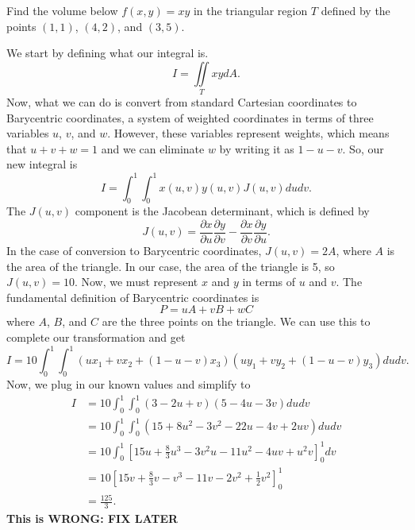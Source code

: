\begin{example}
    Find the volume below $f(x, y) = xy$ in the triangular region $T$ defined by the points $(1, 1)$, $(4, 2)$, and $(3, 5)$.
    
    \begin{soln}
        We start by defining what our integral is.
        \[I = \iint\limits_{T}xydA.\]
        Now, what we can do is convert from standard Cartesian coordinates to Barycentric coordinates, a system of weighted coordinates in terms of three variables $u$, $v$, and $w$. However, these variables represent weights, which means that $u + v + w = 1$ and we can eliminate $w$ by writing it as $1 - u - v$. So, our new integral is
        \[I = \int_{0}^{1}\int_{0}^{1}x(u, v)y(u, v)J(u, v)dudv.\]
        The $J(u, v)$ component is the Jacobean determinant, which is defined by
        \[J(u, v) = \frac{\partial x}{\partial u}\frac{\partial y}{\partial v} - \frac{\partial x}{\partial v}\frac{\partial y}{\partial u}.\]
        In the case of conversion to Barycentric coordinates, $J(u, v) = 2A$, where $A$ is the area of the triangle. In our case, the area of the triangle is 5, so $J(u, v) = 10$. Now, we must represent $x$ and $y$ in terms of $u$ and $v$. The fundamental definition of Barycentric coordinates is
        \[P = uA + vB + wC\]
        where $A$, $B$, and $C$ are the three points on the triangle. We can use this to complete our transformation and get
        \[I = 10\int_{0}^{1}\int_{0}^{1}(ux_{1} + vx_{2} + (1 - u - v)x_{3})(uy_{1} + vy_{2} + (1 - u - v)y_{3})dudv.\]
        Now, we plug in our known values and simplify to
        \begin{align*}
            I &= 10\int_{0}^{1}\int_{0}^{1}(3 - 2u + v)(5 - 4u - 3v)dudv \\
            &= 10\int_{0}^{1}\int_{0}^{1}(15 + 8u^{2} - 3v^{2} - 22u - 4v + 2uv)dudv \\
            &= 10\int_{0}^{1}\left[15u + \frac{8}{3}u^{3} - 3v^{2}u - 11u^{2} - 4uv + u^{2}v\right]_{0}^{1}dv \\
            &= 10\left[15v + \frac{8}{3}v - v^{3} - 11v - 2v^{2} + \frac{1}{2}v^{2}\right]_{0}^{1} \\
            &= \frac{125}{3}.
        \end{align*}
        \textbf{This is WRONG: FIX LATER}
    \end{soln}
\end{example}

